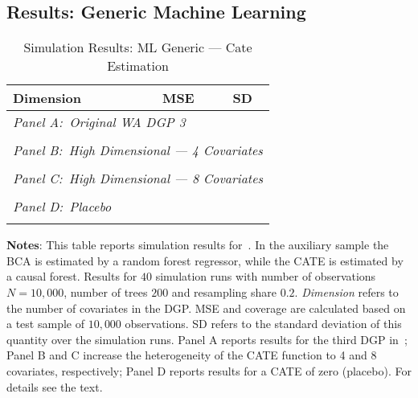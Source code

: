 \documentclass[11pt, a4paper, leqno]{article}
\begin{document}
\subsection{Results: Generic Machine Learning}


\begin{table}
    \caption{Simulation Results: ML Generic --- Cate Estimation}
    \begin{threeparttable}
    \center
    \begin{tabular}{lcc}
        Dimension & MSE & SD \\
        \toprule
        \multicolumn{3}{l}{\textit{Panel A:\ Original WA DGP 3}} \\
         \\
        \midrule

        \multicolumn{3}{l}{\textit{Panel B:\ High Dimensional --- 4 Covariates}} \\
         \\
        \midrule

        \multicolumn{3}{l}{\textit{Panel C:\ High Dimensional --- 8 Covariates}} \\
         \\
        \midrule

        \multicolumn{3}{l}{\textit{Panel D:\ Placebo}} \\
         \\
        \bottomrule
    \end{tabular}
    \begin{tablenotes}
        \small
        \item \textbf{Notes}: This table reports simulation results for~\cite{chernozhukov2023genml}.
        In the auxiliary sample the BCA is estimated by a random forest regressor, while the CATE is estimated by a causal forest.
        Results for $40$ simulation runs with number of observations $N=10,000$, number of trees $200$ and resampling share $0.2$.
        \textit{Dimension} refers to the number of covariates in the DGP\@.
        MSE and coverage are calculated based on a test sample of $10,000$ observations. SD refers to the standard deviation of this quantity over the simulation runs.
        Panel A reports results for the third DGP in~\cite{wager2018estimation}; Panel B and C increase the heterogeneity of the CATE function to 4 and 8 covariates, respectively; Panel D reports results for a CATE of zero (placebo).
        For details see the text.
    \end{tablenotes}
\end{threeparttable}

\end{table}
\end{document}
